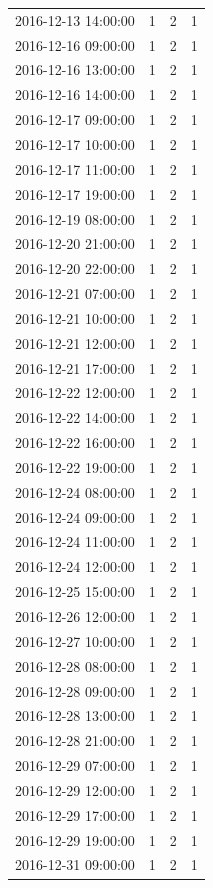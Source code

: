 \begin{tabular}{lrrr}
2016-12-13 14:00:00 & 1 & 2 & 1 \\
2016-12-16 09:00:00 & 1 & 2 & 1 \\
2016-12-16 13:00:00 & 1 & 2 & 1 \\
2016-12-16 14:00:00 & 1 & 2 & 1 \\
2016-12-17 09:00:00 & 1 & 2 & 1 \\
2016-12-17 10:00:00 & 1 & 2 & 1 \\
2016-12-17 11:00:00 & 1 & 2 & 1 \\
2016-12-17 19:00:00 & 1 & 2 & 1 \\
2016-12-19 08:00:00 & 1 & 2 & 1 \\
2016-12-20 21:00:00 & 1 & 2 & 1 \\
2016-12-20 22:00:00 & 1 & 2 & 1 \\
2016-12-21 07:00:00 & 1 & 2 & 1 \\
2016-12-21 10:00:00 & 1 & 2 & 1 \\
2016-12-21 12:00:00 & 1 & 2 & 1 \\
2016-12-21 17:00:00 & 1 & 2 & 1 \\
2016-12-22 12:00:00 & 1 & 2 & 1 \\
2016-12-22 14:00:00 & 1 & 2 & 1 \\
2016-12-22 16:00:00 & 1 & 2 & 1 \\
2016-12-22 19:00:00 & 1 & 2 & 1 \\
2016-12-24 08:00:00 & 1 & 2 & 1 \\
2016-12-24 09:00:00 & 1 & 2 & 1 \\
2016-12-24 11:00:00 & 1 & 2 & 1 \\
2016-12-24 12:00:00 & 1 & 2 & 1 \\
2016-12-25 15:00:00 & 1 & 2 & 1 \\
2016-12-26 12:00:00 & 1 & 2 & 1 \\
2016-12-27 10:00:00 & 1 & 2 & 1 \\
2016-12-28 08:00:00 & 1 & 2 & 1 \\
2016-12-28 09:00:00 & 1 & 2 & 1 \\
2016-12-28 13:00:00 & 1 & 2 & 1 \\
2016-12-28 21:00:00 & 1 & 2 & 1 \\
2016-12-29 07:00:00 & 1 & 2 & 1 \\
2016-12-29 12:00:00 & 1 & 2 & 1 \\
2016-12-29 17:00:00 & 1 & 2 & 1 \\
2016-12-29 19:00:00 & 1 & 2 & 1 \\
2016-12-31 09:00:00 & 1 & 2 & 1 \\

\end{tabular}
